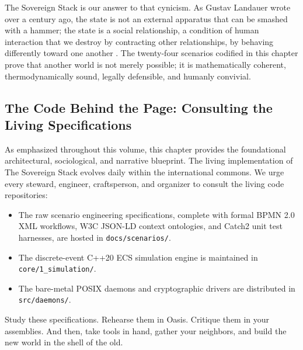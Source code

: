 The Sovereign Stack is our answer to that cynicism. As Gustav Landauer wrote over a century ago, the state is not an external apparatus that can be smashed with a hammer; the state is a social relationship, a condition of human interaction that we destroy by contracting other relationships, by behaving differently toward one another \parencite{landauer2010}. The twenty-four scenarios codified in this chapter prove that another world is not merely possible; it is mathematically coherent, thermodynamically sound, legally defensible, and humanly convivial.

\subsection{The Code Behind the Page: Consulting the Living Specifications}
As emphasized throughout this volume, this chapter provides the foundational architectural, sociological, and narrative blueprint. The living implementation of The Sovereign Stack evolves daily within the international commons. We urge every steward, engineer, craftsperson, and organizer to consult the living code repositories:
\begin{itemize}
    \item The raw scenario engineering specifications, complete with formal BPMN 2.0 XML workflows, W3C JSON-LD context ontologies, and Catch2 unit test harnesses, are hosted in \texttt{docs/scenarios/}.
    \item The discrete-event C++20 ECS simulation engine is maintained in \texttt{core/1\_simulation/}.
    \item The bare-metal POSIX daemons and cryptographic drivers are distributed in \texttt{src/daemons/}.
\end{itemize}

Study these specifications. Rehearse them in Oasis. Critique them in your assemblies. And then, take tools in hand, gather your neighbors, and build the new world in the shell of the old.
